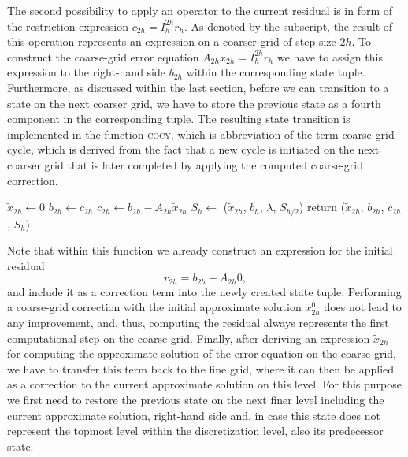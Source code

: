The second possibility to apply an operator to the current residual is in form of the restriction expression $c_{2h} = I_{h}^{2h} r_h$.
As denoted by the subscript, the result of this operation represents an expression on a coarser grid of step size $2h$.
To construct the coarse-grid error equation $A_{2h} x_{2h} = I_{h}^{2h} r_h$ we have to assign this expression to the right-hand side $b_{2h}$ within the corresponding state tuple.
Furthermore, as discussed within the last section, before we can transition to a state on the next coarser grid, we have to store the previous state as a fourth component in the corresponding tuple.
The resulting state transition is implemented in the function \textsc{cocy}, which is abbreviation of the term coarse-grid cycle, which is derived from the fact that a new cycle is initiated on the next coarser grid that is later completed by applying the computed coarse-grid correction.
\begin{algorithm}
	\begin{algorithmic}
		\State $\tilde{x}_{2h} \gets 0$ 
		\State $b_{2h} \gets c_{2h}$
		\State $c_{2h} \gets b_{2h} - A_{2h} \tilde{x}_{2h}$ 
		\State $S_h \gets$ ($\tilde{x}_{2h}$, $b_{h}$, $\lambda$, $S_{h/2}$)
		\State return ($\tilde{x}_{2h}$, $b_{2h}$, $c_{2h}$, $S_h$)
		\EndFunction
	\end{algorithmic}
\end{algorithm}
Note that within this function we already construct an expression for the initial residual
\begin{equation}
	r_{2h} = b_{2h} - A_{2h} 0,
\end{equation} 
and include it as a correction term into the newly created state tuple.
Performing a coarse-grid correction with the initial approximate solution $x^0_{2h}$ does not lead to any improvement, and, thus, computing the residual always represents the first computational step on the coarse grid.
Finally, after deriving an expression $\tilde{x}_{2h}$ for computing the approximate solution of the error equation on the coarse grid, we have to transfer this term back to the fine grid, where it can then be applied as a correction to the current approximate solution on this level.
For this purpose we first need to restore the previous state on the next finer level including the current approximate solution, right-hand side and, in case this state does not represent the topmost level within the discretization level, also its predecessor state.
